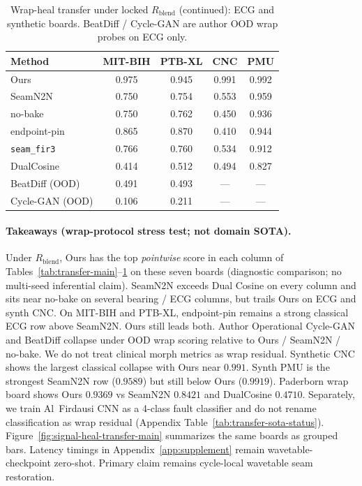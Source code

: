 \begin{table}[t]
  \centering
  \caption{Wrap-heal transfer under locked $R_{\mathrm{blend}}$ (continued): ECG and synthetic boards.
  BeatDiff / Cycle-GAN are author OOD wrap probes on ECG only.}
  \label{tab:transfer-main-b}
  \setlength{\tabcolsep}{2.5pt}
  \footnotesize
  \begin{tabular}{@{}lcccc@{}}
    \toprule
    Method & MIT-BIH & PTB-XL & CNC & PMU \\
    \midrule
    Ours & 0.975 & 0.945 & 0.991 & 0.992 \\
    SeamN2N & 0.750 & 0.754 & 0.553 & 0.959 \\
    no-bake & 0.750 & 0.762 & 0.450 & 0.936 \\
    endpoint-pin & 0.865 & 0.870 & 0.410 & 0.944 \\
    \texttt{seam\_fir3} & 0.766 & 0.760 & 0.534 & 0.912 \\
    DualCosine & 0.414 & 0.512 & 0.494 & 0.827 \\
    BeatDiff (OOD) & 0.491 & 0.493 & --- & --- \\
    Cycle-GAN (OOD) & 0.106 & 0.211 & --- & --- \\
    \bottomrule
  \end{tabular}
\end{table}

\paragraph{Takeaways (wrap-protocol stress test; not domain SOTA).}
Under $R_{\mathrm{blend}}$, Ours has the top \emph{pointwise} score in each column of Tables~\ref{tab:transfer-main}--\ref{tab:transfer-main-b} on these seven boards (diagnostic comparison; no multi-seed inferential claim).
SeamN2N exceeds Dual Cosine on every column and sits near no-bake on several bearing / ECG columns, but trails Ours
on ECG and synth CNC.
On MIT-BIH and PTB-XL, endpoint-pin remains a strong classical ECG row above SeamN2N. Ours still leads both.
Author Operational Cycle-GAN and BeatDiff collapse under OOD wrap scoring relative to Ours / SeamN2N / no-bake.
We do not treat clinical morph metrics as wrap residual.
Synthetic CNC shows the largest classical collapse with Ours near $0.991$.
Synth PMU is the strongest SeamN2N row ($0.9589$) but still below Ours ($0.9919$).
Paderborn wrap board shows Ours $0.9369$ vs SeamN2N $0.8421$ and DualCosine $0.4710$.
Separately, we train Al~Firdausi CNN as a 4-class fault classifier and do not rename classification as wrap residual
(Appendix Table~\ref{tab:transfer-sota-status}).
Figure~\ref{fig:signal-heal-transfer-main} summarizes the same boards as grouped bars.
Latency timings in Appendix~\ref{app:supplement} remain wavetable-checkpoint zero-shot.
Primary claim remains cycle-local wavetable seam restoration.

